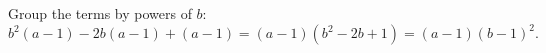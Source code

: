 Group the terms by powers of $b$:
\[
b^2(a-1)-2b(a-1)+(a-1)=(a-1)\left(b^2-2b+1\right)=\boxed{(a-1)(b-1)^2}.
\]
